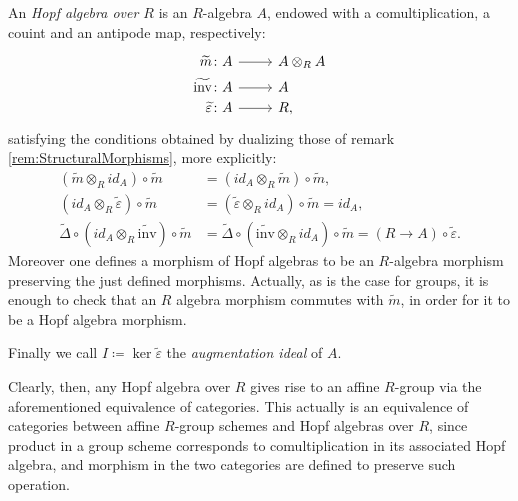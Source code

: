 \documentclass[../Main]{subfiles}
\begin{document}
\begin{defn}\label{defn:HopfAlgebra}
	An {\em Hopf algebra over $R$} is an $R$-algebra $A$,
	endowed with a comultiplication, a couint and an antipode map,
	respectively:
	\begin{equation}
			\begin{tikzcd}[row sep = 0ex
         ,/tikz/column 1/.append style={anchor=base east}
         ,/tikz/column 2/.append style={anchor=base west}
         ,/tikz/column 3/.append style={anchor=base east}]
			\widetilde{m}\colon A \arrow[r, "", rightarrow] &
			A \otimes_R A \\
			\widetilde{\mathrm{inv}}\colon A \arrow[r, "", rightarrow] &
			A \\
			\widetilde{\varepsilon} \colon A \arrow[r, "", rightarrow] &
			R,
		\end{tikzcd}
	\end{equation} 
	satisfying the conditions obtained by dualizing those
	of remark \ref{rem:StructuralMorphisms}, more explicitly:
	\begin{align}
		( \widetilde{m} \otimes_R id_A ) \circ \widetilde{m} &=
		( id_A \otimes_R \widetilde{m} ) \circ \widetilde{m},\\
		( id_A \otimes_R \widetilde{\varepsilon} ) \circ \widetilde{m} &=
		( \widetilde{\varepsilon} \otimes_R id_A ) \circ \widetilde{m} =
		id_A,\\
		\widetilde{\Delta} \circ ( id_A \otimes_R \widetilde{\mathrm{inv}} ) 
		\circ \widetilde{m} &=
		\widetilde{\Delta} \circ ( \widetilde{\mathrm{inv}} \otimes_R id_A ) 
		\circ \widetilde{m} =
		(R \to A) \circ \widetilde{\varepsilon}
	.\end{align} 
	Moreover one defines a morphism of Hopf algebras to be an $R$-algebra
	morphism preserving the just defined morphisms.
	Actually, as is the case for groups, it is enough to check that an $R$ algebra
	morphism commutes with $\widetilde{m}$, in order for it to be a Hopf algebra morphism.

	Finally we call $I \coloneqq \ker \widetilde{\varepsilon}$ the 
	{\em augmentation ideal} of $A$.
\end{defn}


\begin{rem}
	Clearly, then, any Hopf algebra over $R$ gives rise
	to an affine $R$-group via the aforementioned equivalence of categories.
	This actually is an equivalence of categories between affine
	$R$-group schemes and Hopf algebras over $R$, since 
	product in a group scheme corresponds to comultiplication in its 
	associated Hopf algebra, and morphism in the two categories are defined
	to preserve such operation.
\end{rem}
\end{document}
